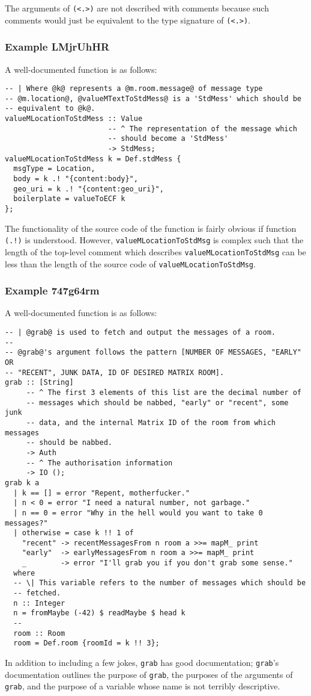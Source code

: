 \documentclass{report}
\begin{document}
The arguments of \texttt{(<.>)} are not described with comments because such comments would just be equivalent to the type signature of \texttt{(<.>)}.
\subsubsection{Example LMjrUhHR}
A well-documented function is as follows:
\begin{lstlisting}
-- | Where @k@ represents a @m.room.message@ of message type
-- @m.location@, @valueMTextToStdMess@ is a 'StdMess' which should be
-- equivalent to @k@.
valueMLocationToStdMess :: Value
                        -- ^ The representation of the message which
                        -- should become a 'StdMess'
                        -> StdMess;
valueMLocationToStdMess k = Def.stdMess {
  msgType = Location,
  body = k .! "{content:body}",
  geo_uri = k .! "{content:geo_uri}",
  boilerplate = valueToECF k
};
\end{lstlisting}
The functionality of the source code of the function is fairly obvious if function \texttt{(.!)} is understood.  However, \texttt{valueMLocationToStdMsg} is complex such that the length of the top-level comment which describes \texttt{valueMLocationToStdMsg} can be less than the length of the source code of \texttt{valueMLocationToStdMsg}.
\subsubsection{Example 747g64rm}
A well-documented function is as follows:
\begin{lstlisting}
-- | @grab@ is used to fetch and output the messages of a room.
--
-- @grab@'s argument follows the pattern [NUMBER OF MESSAGES, "EARLY" OR
-- "RECENT", JUNK DATA, ID OF DESIRED MATRIX ROOM].
grab :: [String]
     -- ^ The first 3 elements of this list are the decimal number of
     -- messages which should be nabbed, "early" or "recent", some junk
     -- data, and the internal Matrix ID of the room from which messages
     -- should be nabbed.
     -> Auth
     -- ^ The authorisation information
     -> IO ();
grab k a
  | k == [] = error "Repent, motherfucker."
  | n < 0 = error "I need a natural number, not garbage."
  | n == 0 = error "Why in the hell would you want to take 0 messages?"
  | otherwise = case k !! 1 of
    "recent" -> recentMessagesFrom n room a >>= mapM_ print
    "early"  -> earlyMessagesFrom n room a >>= mapM_ print
    _        -> error "I'll grab you if you don't grab some sense."
  where
  -- \| This variable refers to the number of messages which should be
  -- fetched.
  n :: Integer
  n = fromMaybe (-42) $ readMaybe $ head k
  --
  room :: Room
  room = Def.room {roomId = k !! 3};
\end{lstlisting}
In addition to including a few jokes, \texttt{grab} has good documentation; \texttt{grab}'s documentation outlines the purpose of \texttt{grab}, the purposes of the arguments of \texttt{grab}, and the purpose of a variable whose name is not terribly descriptive.
\end{document}
